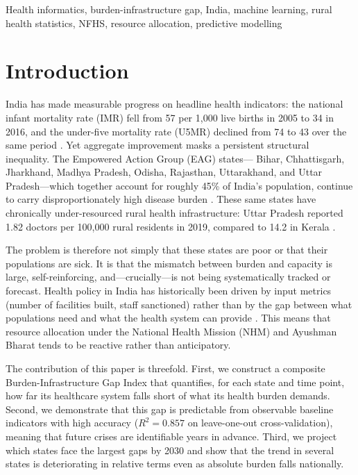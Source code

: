 \documentclass[conference]{IEEEtran}
\begin{document}
\begin{IEEEkeywords}
Health informatics, burden-infrastructure gap, India, machine learning,
rural health statistics, NFHS, resource allocation, predictive modelling
\end{IEEEkeywords}

\section{Introduction}

India has made measurable progress on headline health indicators:
the national infant mortality rate (IMR) fell from 57 per 1,000
live births in 2005 to 34 in 2016, and the under-five mortality
rate (U5MR) declined from 74 to 43 over the same period
\cite{srs2017}. Yet aggregate improvement masks a persistent
structural inequality. The Empowered Action Group (EAG) states---
Bihar, Chhattisgarh, Jharkhand, Madhya Pradesh, Odisha, Rajasthan,
Uttarakhand, and Uttar Pradesh---which together account for roughly
45\% of India's population, continue to carry disproportionately
high disease burden \cite{india_statelevelburd_2017}. These same
states have chronically under-resourced rural health infrastructure:
Uttar Pradesh reported 1.82 doctors per 100,000 rural residents in
2019, compared to 14.2 in Kerala \cite{rhs2020}.

The problem is therefore not simply that these states are poor or that
their populations are sick. It is that the mismatch between burden and
capacity is large, self-reinforcing, and---crucially---is not being
systematically tracked or forecast. Health policy in India has
historically been driven by input metrics (number of facilities built,
staff sanctioned) rather than by the gap between what populations
need and what the health system can provide \cite{Balarajan2011}. This
means that resource allocation under the National Health Mission (NHM)
and Ayushman Bharat \cite{Prinja2021} tends to be reactive rather
than anticipatory.

The contribution of this paper is threefold. First, we construct a
composite Burden-Infrastructure Gap Index that quantifies, for each
state and time point, how far its healthcare system falls short of
what its health burden demands. Second, we demonstrate that this gap
is predictable from observable baseline indicators with high accuracy
($R^2 = 0.857$ on leave-one-out cross-validation), meaning that
future crises are identifiable years in advance. Third, we project
which states face the largest gaps by 2030 and show that the trend
in several states is deteriorating in relative terms even as absolute
burden falls nationally.
\end{document}
